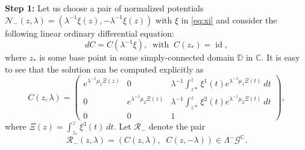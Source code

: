 \documentclass[12pt]{amsart}
\theoremstyle{definition}
\theoremstyle{remark}
\numberwithin{equation}{section}
\begin{document}
 {\bf Step 1:} Let us choose a pair of normalized potentials 
 ${\mathcal N}_{-} (z, {\lambda}) = ({\lambda}^{-1} \xi(z), -{\lambda}^{-1}\xi(z))$ with $\xi$ in \eqref{eq:xi} and 
 consider the following linear ordinary differential equation: 
\begin{equation*}
 d C = C ({\lambda}^{-1}\xi),\;\;\mbox{with}\;\;C(z_*) = {\operatorname{id}},
\end{equation*}
 where $z_*$ is some base point in some simply-connected domain $\mathbb D$ in 
 $\mathbb C$.
 It is easy to see that the solution can be computed explicitly as 
\begin{equation*}
 C(z, {\lambda}) =
 \begin{pmatrix}
  e^{{\lambda}^{-1} \mu_1 \Xi(z)} & 0 & {\lambda}^{-1}\int_{z*}^z \xi^1 (t)e^{ {\lambda}^{-1}\mu_1\Xi(t)}\>dt\\
  0 & e^{{\lambda}^{-1} \mu_2 \Xi(z)} &  {\lambda}^{-1}\int_{z*}^z \xi^2 (t)e^{{\lambda}^{-1}\mu_2\Xi(t)}\>dt\\
  0 & 0 & 1
 \end{pmatrix},
\end{equation*}
 where $\Xi (z) =\int_{z_*}^z \xi^3 (t)\> dt$. Let ${\mathcal R}_{-}$ denote the pair 
\begin{equation*}
 {\mathcal R}_{-}(z, {\lambda}) = (C (z, {\lambda}), \;\;C(z, -{\lambda})) \in {\Lambda^{-} {\mathcal G}^{\mathbb C}}.
\end{equation*}
\end{document}
